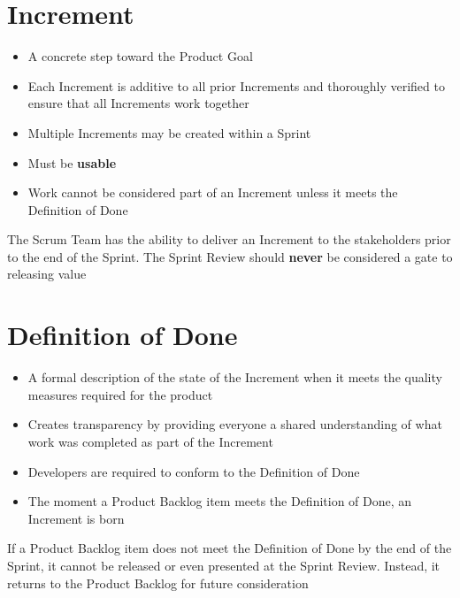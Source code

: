 \documentclass[a4paper,11pt,twocolumn]{article}
\begin{document}
\section*{Increment}
\begin{itemize}
	\item A concrete step toward the Product Goal
	\item Each Increment is additive to all prior Increments and thoroughly verified to ensure that all Increments work together
	\item Multiple Increments may be created within a Sprint
	\item Must be \textbf{usable}
	\item Work cannot be considered part of an Increment unless it meets the Definition of Done
\end{itemize}

\begin{tcolorbox}[colback=black!8!white,colframe=gray!50!black,title=Note,sharp corners,fonttitle=\normalsize\bfseries,fontupper=\normalsize,left=0.7em,right=0.7em]
	The Scrum Team has the ability to deliver an Increment to the stakeholders prior to the end of the Sprint. The Sprint Review should \textbf{never} be considered a gate to releasing value
\end{tcolorbox}

\section*{Definition of Done}
\begin{itemize}
	\item A formal description of the state of the Increment when it meets the quality measures required for the product
	\item Creates transparency by providing everyone a shared understanding of what work was completed as part of the Increment
	\item Developers are required to conform to the Definition of Done
	\item The moment a Product Backlog item meets the Definition of Done, an Increment is born
\end{itemize}

\begin{tcolorbox}[colback=black!8!white,colframe=gray!50!black,title=Note,sharp corners,fonttitle=\normalsize\bfseries,fontupper=\normalsize,left=0.7em,right=0.7em]
	If a Product Backlog item does not meet the Definition of Done by the end of the Sprint, it cannot be released or even presented at the Sprint Review. Instead, it returns to the Product Backlog for future consideration
\end{tcolorbox}
\end{document}
